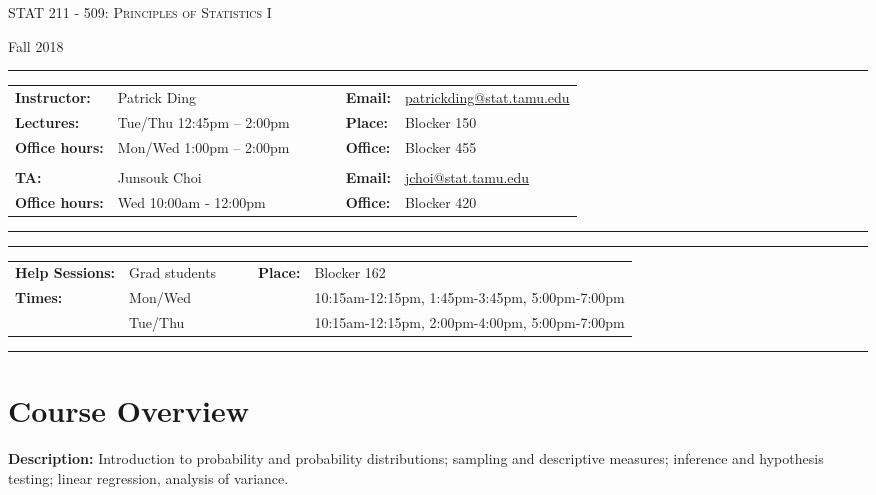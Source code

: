 \documentclass[11pt, a4paper]{article}
\begin{document}
\begin{center}
{\Large \textsc{STAT 211 - 509: Principles of Statistics I}}
\end{center}
\begin{center}
Fall 2018
\end{center}

\begin{center}
\rule{\textwidth}{0.4pt}
\begin{minipage}[t]{\textwidth}
\begin{tabular}{llcccll}
\textbf{Instructor:} & Patrick Ding & & &  & \textbf{Email:} & \url{patrickding@stat.tamu.edu} 
\\
\textbf{Lectures:} &  Tue/Thu 12:45pm -- 2:00pm & & & & \textbf{Place:} & Blocker 150
\\
\textbf{Office hours:} & Mon/Wed 1:00pm -- 2:00pm   & & & & \textbf{Office:} & Blocker 455
\\\\
\textbf{TA:} & Junsouk Choi & & & & \textbf{Email:} & \url{jchoi@stat.tamu.edu}
\\
\textbf{Office hours:} & Wed 10:00am - 12:00pm   & & & & \textbf{Office:} & Blocker 420 
\end{tabular}
\end{minipage}
\rule{\textwidth}{0.4pt}
\end{center}

\begin{center}
\rule{\textwidth}{0.4pt}
\begin{minipage}[t]{\textwidth}
\begin{tabular}{llccll}
\textbf{Help Sessions:} & Grad students & & & \textbf{Place:} & Blocker 162
\\
\textbf{Times:} & Mon/Wed & & & & 10:15am-12:15pm, 1:45pm-3:45pm, 5:00pm-7:00pm
\\
 & Tue/Thu & & & & 10:15am-12:15pm, 2:00pm-4:00pm, 5:00pm-7:00pm
\end{tabular}
\end{minipage}
\rule{\textwidth}{0.4pt}
\end{center}

\section{Course Overview}

\noindent\textbf{Description:} 
Introduction to probability and probability distributions; sampling and descriptive measures; inference and hypothesis testing; linear regression, analysis of variance. 
\end{document}
